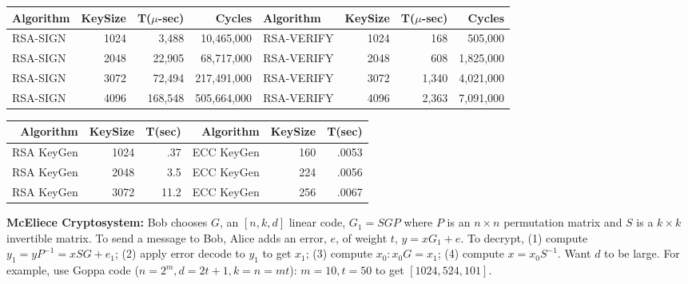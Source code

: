 \begin{center}
\begin{tabular} {|l|rrr|l|rrr|}
\hline
{\bf Algorithm} & {\bf KeySize} & {\bf T($\mu$-sec)} & {\bf Cycles} &
{\bf Algorithm} & {\bf KeySize} & {\bf T($\mu$-sec)} & {\bf Cycles} \\
\hline
RSA-SIGN & 1024 & 3,488 & 10,465,000 &
RSA-VERIFY	& 1024 & 168 & 505,000 \\
RSA-SIGN & 2048 & 22,905 & 68,717,000 &
RSA-VERIFY	& 2048 & 608 & 1,825,000 \\
RSA-SIGN & 3072 & 72,494 & 217,491,000 &
RSA-VERIFY & 3072 & 1,340 & 4,021,000 \\
RSA-SIGN & 4096 & 168,548 & 505,664,000 &
RSA-VERIFY & 4096 & 2,363 & 7,091,000 \\
\hline
\end{tabular}
\end{center}
\begin{center}
\begin{tabular} {|rrr||rrr|}
\hline
{\bf Algorithm} & {\bf KeySize} & {\bf T(sec)} & {\bf Algorithm} & {\bf KeySize} & {\bf T(sec)} \\
\hline
RSA KeyGen & 1024 & .37 & ECC KeyGen & 160 & .0053 \\
RSA KeyGen & 2048 & 3.5 & ECC KeyGen & 224 & .0056 \\
RSA KeyGen & 3072 & 11.2 & ECC KeyGen & 256 & .0067 \\
\hline
\end{tabular}
\end{center}
{\bf McEliece Cryptosystem: }  Bob chooses $G$, an $[n,k,d]$ linear code,
$G_1= SGP$ where $P$ is an $n \times n$ permutation matrix and $S$ is a $k \times k$
invertible matrix.  To send a message to Bob, Alice adds an error, $e$, of weight $t$,
$y=xG_1+e$.  To decrypt, (1) compute $y_1= yP^{-1}= xSG+e_1$; (2) apply error
decode to $y_1$ to get $x_1$; (3) compute $x_0: x_0G= x_1$; (4) compute $x=x_0S^{-1}$.
Want $d$ to be large.  For example, use Goppa code ($n=2^m, d= 2t+1, k= n=mt$): 
$m=10, t=50$ to get $[1024, 524, 101]$.
\\
\\
